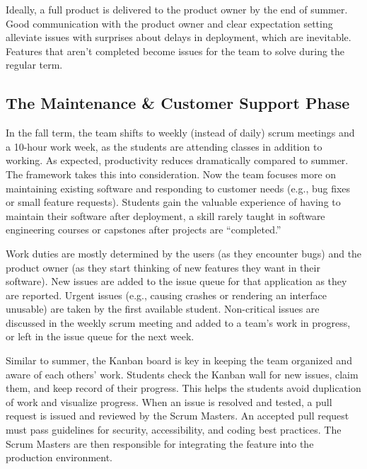 Ideally, a full product is delivered to the product owner by the end of summer. Good communication with the product owner and clear expectation setting alleviate issues with surprises about delays in deployment, which are inevitable. Features that aren't completed become issues for the team to solve during the regular term. 

\subsection{The Maintenance \& Customer Support Phase}
In the fall term, the team shifts to weekly (instead of daily) scrum meetings and a 10-hour work week, as the students are attending classes in addition to working. As expected, productivity reduces dramatically compared to summer. The framework takes this into consideration. Now the team focuses more on maintaining existing software and responding to customer needs (e.g., bug fixes or small feature requests). Students gain the valuable experience of having to maintain their software after deployment, a skill rarely taught in software engineering courses or capstones after projects are ``completed.''


Work duties are mostly determined by the users (as they encounter bugs) and the product owner (as they start thinking of new features they want in their software). New issues are added to the issue queue for that application as they are reported. Urgent issues (e.g., causing crashes or rendering an interface unusable) are taken by the first available student. Non-critical issues are discussed in the weekly scrum meeting and added to a team's work in progress, or left in the issue queue for the next week. 

Similar to summer, the Kanban board is key in keeping the team organized and aware of each others' work. Students check the Kanban wall for new issues, claim them, and keep record of their progress. This helps the students avoid duplication of work and visualize progress. When an issue is resolved and tested, a pull request is issued and reviewed by the Scrum Masters. An accepted pull request must pass guidelines for security, accessibility, and coding best practices. The Scrum Masters are then responsible for integrating the feature into the production environment.  

